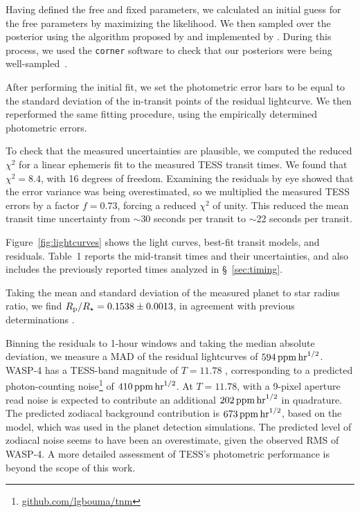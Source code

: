 \documentclass[12pt,twocolumn,tighten]{aastex62}
\begin{document}
Having defined the free and fixed parameters, we calculated an initial
guess for the free parameters by maximizing the likelihood.  We then
sampled over the posterior using the algorithm proposed by
\citet{goodman_ensemble_2010} and implemented by
\citet{foreman-mackey_emcee_2013}.  During this process, we used the
\texttt{corner} software to check that our posteriors were being
well-sampled~\citep{corner_2016}.

After performing the initial fit, we set the photometric error bars to
be equal to the standard deviation of the in-transit points of the
residual lightcurve.  We then reperformed the same fitting procedure,
using the empirically determined photometric errors.

To check that the measured uncertainties are plausible, we computed the
reduced $\chi^2$ for a linear ephemeris fit to the measured TESS transit
times.  We found that $\chi^2 = 8.4$, with 16 degrees of freedom.
Examining the residuals by eye showed that the error variance was being
overestimated, so we multiplied the measured TESS errors by a factor
$f=0.73$, forcing a reduced $\chi^2$ of unity.  This reduced the mean
transit time uncertainty from $\sim$30 seconds per transit to $\sim$22
seconds per transit.

Figure~\ref{fig:lightcurves} shows the light curves, best-fit transit
models, and residuals.  Table~1 reports the mid-transit times and
their uncertainties, and also includes the previously reported times
analyzed in \S~\ref{sec:timing}.

Taking the mean and standard deviation of the measured planet to star
radius ratio, we find $R_{\rm p}/R_\star=0.1538\pm0.0013$, in
agreement with previous determinations
\citep{wilson_wasp-4b_2008,gillon_improved_2009,winn_transit_2009,southworth_high-precision_2009}.

Binning the residuals to 1-hour windows and taking the median absolute
deviation, we measure a MAD of the residual lightcurves of $594\,{\rm
ppm}\,{\rm hr}^{1/2}$.  WASP-4 has a TESS-band magnitude of $T=11.78$
\citep{stassun_TIC_2018}, corresponding to a predicted photon-counting
noise\footnote{\url{github.com/lgbouma/tnm}} of $410\,{\rm ppm}\,{\rm
hr}^{1/2}$.  At $T=11.78$, with a 9-pixel aperture read noise is
expected to contribute an additional $202\,{\rm ppm}\,{\rm hr}^{1/2}$ in
quadrature.  The predicted zodiacal background contribution is
$673\,{\rm ppm}\,{\rm hr}^{1/2}$, based on the
\citet{winn_photonflux_2013} model, which was used in the
\citet{Sullivan_2015} planet detection simulations.  The predicted level
of zodiacal noise seems to have been an overestimate, given the observed
RMS of WASP-4.  A more detailed assessment of TESS's photometric
performance is beyond the scope of this work.
\end{document}
